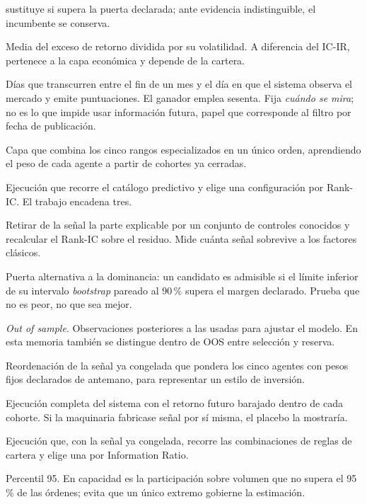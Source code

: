 \begin{description}[leftmargin=3.2cm,style=nextline,itemsep=0.45em]
  sustituye si supera la puerta declarada; ante evidencia indistinguible, el incumbente se conserva.
  \item[Information Ratio (IR)] Media del exceso de retorno dividida por su volatilidad. A
  diferencia del IC-IR, pertenece a la capa económica y depende de la cartera.
  \item[Lag de observación] Días que transcurren entre el fin de un mes y el día en que el sistema
  observa el mercado y emite puntuaciones. El ganador emplea sesenta. Fija \emph{cuándo se mira}; no
  es lo que impide usar información futura, papel que corresponde al filtro por fecha de
  publicación.
  \item[Meta-agente] Capa que combina los cinco rangos especializados en un único orden, aprendiendo
  el peso de cada agente a partir de cohortes ya cerradas.
  \item[Model Study] Ejecución que recorre el catálogo predictivo y elige una configuración por
  Rank-IC. El trabajo encadena tres.
  \item[Neutralización por estilo] Retirar de la señal la parte explicable por un conjunto de
  controles conocidos y recalcular el Rank-IC sobre el residuo. Mide cuánta señal sobrevive a los
  factores clásicos.
  \item[No inferioridad] Puerta alternativa a la dominancia: un candidato es admisible si el límite
  inferior de su intervalo \textit{bootstrap} pareado al 90\,\% supera el margen declarado. Prueba
  que no es peor, no que sea mejor.
  \item[OOS] \textit{Out of sample}. Observaciones posteriores a las usadas para ajustar el modelo.
  En esta memoria también se distingue dentro de OOS entre selección y reserva.
  \item[Perfil de inversor] Reordenación de la señal ya congelada que pondera los cinco agentes con
  pesos fijos declarados de antemano, para representar un estilo de inversión.
  \item[Placebo de etiqueta] Ejecución completa del sistema con el retorno futuro barajado dentro de
  cada cohorte. Si la maquinaria fabricase señal por sí misma, el placebo la mostraría.
  \item[Portfolio Study] Ejecución que, con la señal ya congelada, recorre las combinaciones de
  reglas de cartera y elige una por Information Ratio.
  \item[P95] Percentil 95. En capacidad es la participación sobre volumen que no supera el 95\,\%
  de las órdenes; evita que un único extremo gobierne la estimación.

\end{description}
